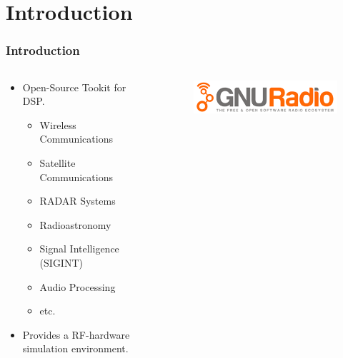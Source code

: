 \section{Introduction} %


\begin{frame}
\frametitle{Introduction}
\begin{columns}
        \begin{column}{0.5\textwidth}
     \begin{itemize}
         \item Open-Source Tookit for DSP.
         \begin{itemize}
             \item Wireless Communications
             \item Satellite Communications
             \item RADAR Systems
             \item Radioastronomy
             \item Signal Intelligence (SIGINT)
             \item Audio Processing
             \item etc.
         \end{itemize}
\item Provides a RF-hardware simulation environment.
     \end{itemize}

        \end{column}
        
        \begin{column}{0.5\textwidth}
            \begin{figure}[t]
                \centering
                \includegraphics[width=\linewidth]{img/GNU_radio_logo.png}
                \label{fig:gnu_radio_logo}
            \end{figure}
        \end{column}
    \end{columns}
     \end{frame}

